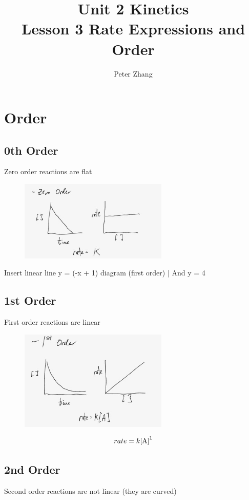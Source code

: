 \documentclass{article}
\title{Unit 2 Kinetics\\Lesson 3 Rate Expressions and Order}
\author{Peter Zhang}
\begin{document}
\maketitle
\newpage
\tableofcontents
\newpage


\section{Order}
\subsection{0th Order}
Zero order reactions are flat

\begin{figure}[H]
\centering
\includegraphics[width=200pt]{2.3fig1.jpg}
\end{figure}

Insert linear line y = (-x + 1) diagram (first order) | And y = 4

\subsection{1st Order}
First order reactions are linear
\begin{figure}[H]
\centering
\includegraphics[width=200pt]{2.3fig2.jpg}
\end{figure}


$$rate = k\ce{[A]}^1$$

\subsection{2nd Order}
Second order reactions are not linear (they are curved)
\end{document}
